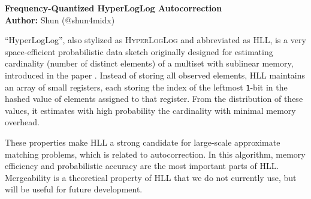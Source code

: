 \documentclass[12pt,a4paper]{article}
\begin{document}
\begin{center}
  {\Large \bf Frequency-Quantized HyperLogLog Autocorrection}\\[12pt]
  \textbf{Author:} Shun (@shun4midx)
\end{center}


``HyperLogLog'', also stylized as \textsc{HyperLogLog} and abbreviated as HLL, is a very space-efficient probabilistic data sketch originally designed for estimating cardinality (number of distinct elements) of a multiset with sublinear memory, introduced in the paper \cite{fla+07}. Instead of storing all observed elements, HLL maintains an array of small registers, each storing the index of the leftmost \texttt{1}-bit in the hashed value of elements assigned to that register. From the distribution of these values, it estimates with high probability the cardinality with minimal memory overhead. \newline


These properties make HLL a strong candidate for large-scale approximate matching problems, which is related to autocorrection. In this algorithm, memory efficiency and probabilistic accuracy are the most important parts of HLL. Mergeability is a theoretical property of HLL that we do not currently use, but will be useful for future development. \newline
\end{document}
